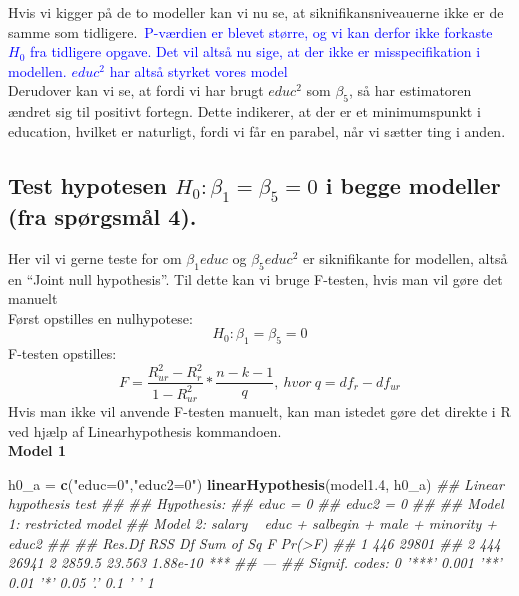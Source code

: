 \documentclass[
  10pt,
]{article}
\newenvironment{Shaded}{\begin{snugshade}}{\end{snugshade}}
\newcommand{\CommentTok}[1]{\textcolor[rgb]{0.56,0.35,0.01}{\textit{#1}}}
\newcommand{\FloatTok}[1]{\textcolor[rgb]{0.00,0.00,0.81}{#1}}
\newcommand{\KeywordTok}[1]{\textcolor[rgb]{0.13,0.29,0.53}{\textbf{#1}}}
\newcommand{\NormalTok}[1]{#1}
\newcommand{\StringTok}[1]{\textcolor[rgb]{0.31,0.60,0.02}{#1}}
\begin{document}
Hvis vi kigger på de to modeller kan vi nu se, at siknifikansniveauerne
ikke er de samme som
tidligere.~\textcolor{blue}{P-værdien er blevet større, og vi kan derfor ikke forkaste $H_0$ fra tidligere opgave. Det vil altså nu sige, at der ikke er misspecifikation i modellen. $educ^2$ har altså styrket vores model}\\
Derudover kan vi se, at fordi vi har brugt \(educ^2\) som \(\beta_5\),
så har estimatoren ændret sig til positivt fortegn. Dette indikerer, at
der er et minimumspunkt i education, hvilket er naturligt, fordi vi får
en parabel, når vi sætter ting i anden.

\hypertarget{test-hypotesen-h_0-beta_1-beta_5-0-i-begge-modeller-fra-spuxf8rgsmuxe5l-4.}{%
\subsection{\texorpdfstring{Test hypotesen
\(H_0 : \beta_1 = \beta_5 = 0\) i begge modeller (fra spørgsmål
4).}{Test hypotesen H\_0 : \textbackslash beta\_1 = \textbackslash beta\_5 = 0 i begge modeller (fra spørgsmål 4).}}\label{test-hypotesen-h_0-beta_1-beta_5-0-i-begge-modeller-fra-spuxf8rgsmuxe5l-4.}}

\leavevmode

Her vil vi gerne teste for om \(\beta_1educ\) og \(\beta_5educ^2\) er
siknifikante for modellen, altså en ``Joint null hypothesis''. Til dette
kan vi bruge F-testen, hvis man vil gøre det manuelt\\
Først opstilles en nulhypotese: \[ H_0:\beta_1=\beta_5=0\] F-testen
opstilles:
\[F=\frac{R_{ur}^2-R_r^2}{1-R_{ur}^2}*\frac{n-k-1}{q},\ hvor\ q=df_r-df_{ur} \]
Hvis man ikke vil anvende F-testen manuelt, kan man istedet gøre det
direkte i R ved hjælp af Linearhypothesis kommandoen.\\
\textbf{Model 1}

\begin{Shaded}
\begin{Highlighting}[]

\NormalTok{h0_a =}\StringTok{ }\KeywordTok{c}\NormalTok{(}\StringTok{"educ=0"}\NormalTok{,}\StringTok{"educ2=0"}\NormalTok{)}
\KeywordTok{linearHypothesis}\NormalTok{(model1}\FloatTok{.4}\NormalTok{, h0_a)}
\CommentTok{## Linear hypothesis test}
\CommentTok{## }
\CommentTok{## Hypothesis:}
\CommentTok{## educ = 0}
\CommentTok{## educ2 = 0}
\CommentTok{## }
\CommentTok{## Model 1: restricted model}
\CommentTok{## Model 2: salary ~ educ + salbegin + male + minority + educ2}
\CommentTok{## }
\CommentTok{##   Res.Df   RSS Df Sum of Sq      F   Pr(>F)    }
\CommentTok{## 1    446 29801                                 }
\CommentTok{## 2    444 26941  2    2859.5 23.563 1.88e-10 ***}
\CommentTok{## ---}
\CommentTok{## Signif. codes:  0 '***' 0.001 '**' 0.01 '*' 0.05 '.' 0.1 ' ' 1}
\end{Highlighting}
\end{Shaded}
\end{document}
